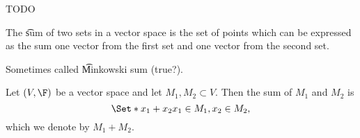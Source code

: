 
\sbasic





























\sstart
{}


TODO


The \t{sum} of two sets in a vector space is the set of points which can be expressed as the sum one vector from the first set and one vector from the second set.

Sometimes called \t{Minkowski sum} (true?).


Let $(V, \F)$ be a vector space and let $M_1, M_2 \subset V$.
Then the sum of $M_1$ and $M_2$ is
$$
  \Set*{x_1 + x_2}{x_1 \in M_1, x_2 \in M_2},
$$
which we denote by $M_1 + M_2$.
\strats
